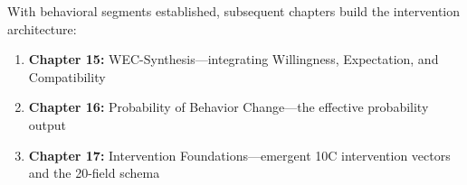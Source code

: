 With behavioral segments established, subsequent chapters build the intervention architecture:

\begin{enumerate}[nosep]
    \item \textbf{Chapter 15:} WEC-Synthesis---integrating Willingness, Expectation, and Compatibility
    \item \textbf{Chapter 16:} Probability of Behavior Change---the effective probability output
    \item \textbf{Chapter 17:} Intervention Foundations---emergent 10C intervention vectors and the 20-field schema
\end{enumerate}


